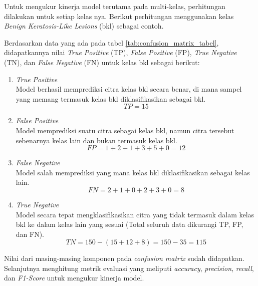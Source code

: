 Untuk mengukur kinerja model terutama pada multi-kelas, perhitungan dilakukan 
untuk setiap kelas nya. Berikut perhitungan menggunakan kelas \textit{Benign 
Keratosis-Like Lesions} (bkl) sebagai contoh. \par

Berdasarkan data yang ada pada tabel \ref{tab:confusion_matrix_tabel}, 
didapatkannya nilai \textit{True Positive} (TP), \textit{False Positive} (FP),
\textit{True Negative} (TN), dan \textit{False Negative} (FN) untuk kelas bkl 
sebagai berikut: \par

\begin{enumerate}[noitemsep]
	\item \textit{True Positive} \\
    Model berhasil memprediksi citra kelas bkl secara benar, di mana sampel 
    yang memang termasuk kelas bkl diklasifikasikan sebagai bkl. \\
    $$TP = 15$$

    \item \textit{False Positive} \\
    Model memprediksi suatu citra sebagai kelas bkl, namun citra tersebut 
    sebenarnya kelas lain dan bukan termasuk kelas bkl. \\
    $$FP = 1 + 2 + 1 + 3 + 5 + 0 = 12$$

    \item \textit{False Negative} \\
    Model salah memprediksi yang mana kelas bkl diklasifikasikan sebagai kelas 
    lain. \\
    $$FN = 2 + 1 + 0 + 2 + 3 + 0 = 8$$

    \item \textit{True Negative} \\
    Model secara tepat mengklasifikasikan citra yang tidak termasuk dalam 
    kelas bkl ke dalam kelas lain yang sesuai (Total seluruh data dikurangi 
    TP, FP, dan FN). \\
    $$TN = 150 - (15 + 12 + 8) = 150 - 35 = 115$$
\end{enumerate} \par

Nilai dari masing-masing komponen pada \textit{confusion matrix} sudah 
didapatkan. Selanjutnya menghitung metrik evaluasi yang meliputi \textit{accuracy},
\textit{precision}, \textit{recall}, dan \textit{F1-Score} untuk mengukur 
kinerja model. \par

